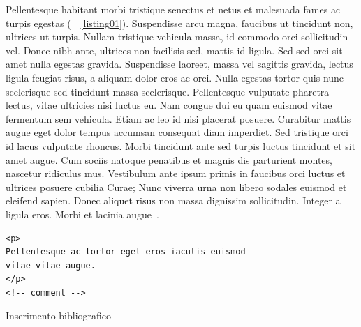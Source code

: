 \documentclass[a4paper,12pt,twoside,openright]{book}
\begin{document}
Pellentesque habitant morbi tristique senectus et netus et malesuada fames ac turpis egestas (\seename\ \lstlistingname~\ref{listing01}). Suspendisse arcu magna, faucibus ut tincidunt non, ultrices ut turpis. Nullam tristique vehicula massa, id commodo orci sollicitudin vel. Donec nibh ante, ultrices non facilisis sed, mattis id ligula. Sed sed orci sit amet nulla egestas gravida. Suspendisse laoreet, massa vel sagittis gravida, lectus ligula feugiat risus, a aliquam dolor eros ac orci. Nulla egestas tortor quis nunc scelerisque sed tincidunt massa scelerisque. Pellentesque vulputate pharetra lectus, vitae ultricies nisi luctus eu. Nam congue dui eu quam euismod vitae fermentum sem vehicula. Etiam ac leo id nisi placerat posuere. Curabitur mattis augue eget dolor tempus accumsan consequat diam imperdiet. Sed tristique orci id lacus vulputate rhoncus. Morbi tincidunt ante sed turpis luctus tincidunt et sit amet augue. Cum sociis natoque penatibus et magnis dis parturient montes, nascetur ridiculus mus. Vestibulum ante ipsum primis in faucibus orci luctus et ultrices posuere cubilia Curae; Nunc viverra urna non libero sodales euismod et eleifend sapien. Donec aliquet risus non massa dignissim sollicitudin. Integer a ligula eros. Morbi et lacinia augue~\cite{bookname}.

\begin{lstlisting}[caption={caption text},label=listing01]
<p>
Pellentesque ac tortor eget eros iaculis euismod
vitae vitae augue.
</p>
<!-- comment -->
\end{lstlisting}

Inserimento bibliografico  \cite{IMU_Euler} \cite{Euler_angles} \cite{EKS_IMU_cv}

 

\backmatter

\begingroup %
  \makeatletter
  \let\ps@plain\ps@empty
  \makeatother
  
\endgroup
\end{document}
